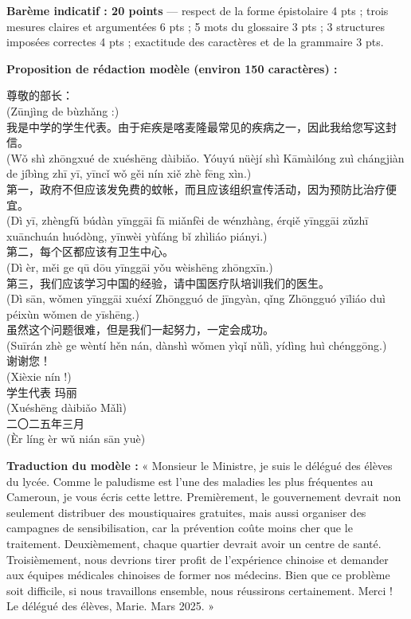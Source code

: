 \documentclass[11pt]{article}
\begin{document}
\begin{corrige}
\textbf{Barème indicatif : 20 points} — respect de la forme épistolaire 4 pts ; trois mesures claires et argumentées 6 pts ; 5 mots du glossaire 3 pts ; 3 structures imposées correctes 4 pts ; exactitude des caractères et de la grammaire 3 pts.

\textbf{Proposition de rédaction modèle (environ 150 caractères) :}

\begin{textebox}
尊敬的部长：\\
(Zūnjìng de bùzhǎng :)\\
我是中学的学生代表。由于疟疾是喀麦隆最常见的疾病之一，因此我给您写这封信。\\
(Wǒ shì zhōngxué de xuéshēng dàibiǎo. Yóuyú nüèjí shì Kāmàilóng zuì chángjiàn de jíbìng zhī yī, yīncǐ wǒ gěi nín xiě zhè fēng xìn.)\\
第一，政府不但应该发免费的蚊帐，而且应该组织宣传活动，因为预防比治疗便宜。\\
(Dì yī, zhèngfǔ búdàn yīnggāi fā miǎnfèi de wénzhàng, érqiě yīnggāi zǔzhī xuānchuán huódòng, yīnwèi yùfáng bǐ zhìliáo piányi.)\\
第二，每个区都应该有卫生中心。\\
(Dì èr, měi ge qū dōu yīnggāi yǒu wèishēng zhōngxīn.)\\
第三，我们应该学习中国的经验，请中国医疗队培训我们的医生。\\
(Dì sān, wǒmen yīnggāi xuéxí Zhōngguó de jīngyàn, qǐng Zhōngguó yīliáo duì péixùn wǒmen de yīshēng.)\\
虽然这个问题很难，但是我们一起努力，一定会成功。\\
(Suīrán zhè ge wèntí hěn nán, dànshì wǒmen yìqǐ nǔlì, yídìng huì chénggōng.)\\
谢谢您！\\
(Xièxie nín !)\\
学生代表 玛丽\\
(Xuéshēng dàibiǎo Mǎlì)\\
二〇二五年三月\\
(Èr líng èr wǔ nián sān yuè)
\end{textebox}

\textbf{Traduction du modèle :} « Monsieur le Ministre, je suis le délégué des élèves du lycée. Comme le paludisme est l'une des maladies les plus fréquentes au Cameroun, je vous écris cette lettre. Premièrement, le gouvernement devrait non seulement distribuer des moustiquaires gratuites, mais aussi organiser des campagnes de sensibilisation, car la prévention coûte moins cher que le traitement. Deuxièmement, chaque quartier devrait avoir un centre de santé. Troisièmement, nous devrions tirer profit de l'expérience chinoise et demander aux équipes médicales chinoises de former nos médecins. Bien que ce problème soit difficile, si nous travaillons ensemble, nous réussirons certainement. Merci ! Le délégué des élèves, Marie. Mars 2025. »


\end{corrige}
\end{document}
